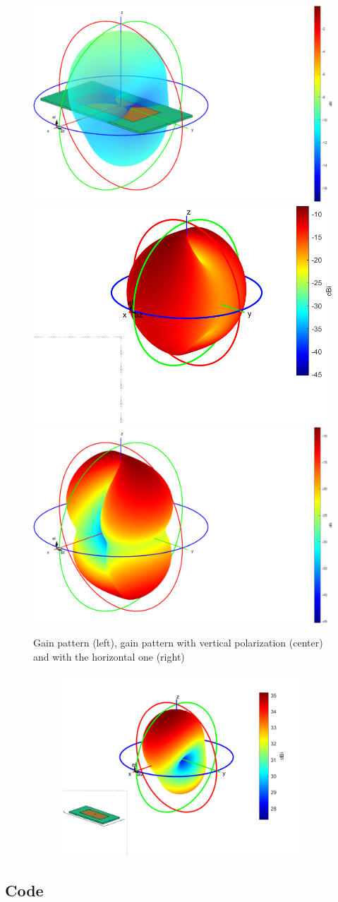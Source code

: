 \documentclass[12pt,a4paper,twocolumn]{article}
\begin{document}
{	\begin{figure}
		\includegraphics[width = 0.3\linewidth]{gain_patch.png}
			\includegraphics[width = 0.3\linewidth]{gain_patch_v.png}
		\includegraphics[width = 0.3\linewidth]{gain_patch_h.png}
		\caption{Gain pattern (left), gain pattern with vertical polarization (center) and with the horizontal one (right)}
	\end{figure}


\begin{figure}[h]
		\begin{subfigure}{0.5\linewidth}
			\includegraphics[scale=0.5]{gain_3D_pifa.pdf}
			\caption{}
		\end{subfigure}
\end{figure}

\subsection*{Code}
}
\end{document}
